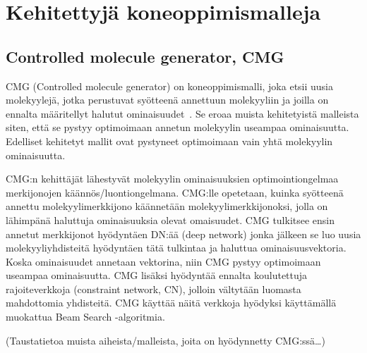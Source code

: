 \documentclass[finnish,twoside,censored,tkt,sw-line]{HYthesisML}
\begin{document}


\section{Kehitettyjä koneoppimismalleja}


\subsection{Controlled molecule generator, CMG}

CMG (Controlled molecule generator) on koneoppimismalli, joka etsii uusia molekyylejä, jotka perustuvat syötteenä annettuun molekyyliin ja joilla on ennalta määritellyt halutut ominaisuudet~\cite{ShinBonggun}.
Se eroaa muista kehitetyistä malleista siten, että se pystyy optimoimaan annetun molekyylin useampaa ominaisuutta.
Edelliset kehitetyt mallit ovat pystyneet optimoimaan vain yhtä molekyylin ominaisuutta.

CMG:n kehittäjät lähestyvät molekyylin ominaisuuksien optimointiongelmaa merkijonojen käännös/luontiongelmana.
CMG:lle opetetaan, kuinka syötteenä annettu molekyylimerkkijono käännetään molekyylimerkkijonoksi, jolla on lähimpänä haluttuja ominaisuuksia olevat omaisuudet.
CMG tulkitsee ensin annetut merkkijonot hyödyntäen DN:ää (deep network) jonka jälkeen se luo uusia molekyyliyhdisteitä hyödyntäen tätä tulkintaa ja haluttua ominaisuusvektoria.
Koska ominaisuudet annetaan vektorina, niin CMG pystyy optimoimaan useampaa ominaisuutta.
CMG lisäksi hyödyntää ennalta koulutettuja rajoiteverkkoja (constraint network, CN), jolloin vältytään luomasta mahdottomia yhdisteitä.
CMG käyttää näitä verkkoja hyödyksi käyttämällä muokattua Beam Search -algoritmia.

(Taustatietoa muista aiheista/malleista, joita on hyödynnetty CMG:ssä\dots)
\end{document}
